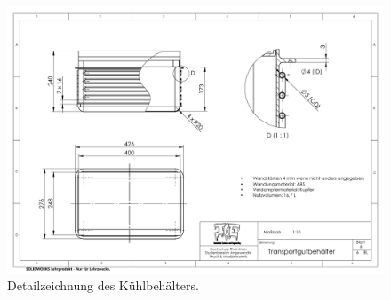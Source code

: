 	\clearpage
	\begin{figure}[h]
		\centering
		\includegraphics[angle=90, height=\textheight]{Assembly/nutzvolumen_zeichnung.PDF}
		\caption[Detailzeichnung des Kühlbehälters.]{Detailzeichnung des Kühlbehälters.}
		\label{fig:nutzvolumen zeichnung}
	\end{figure}